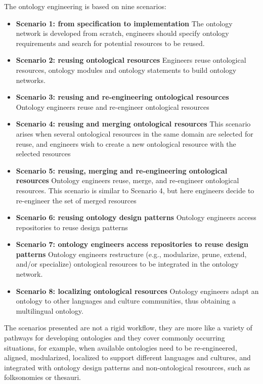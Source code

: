 The ontology engineering is based on nine scenarios:
\begin{itemize}
    \item \textbf{Scenario 1: from specification to implementation} The ontology network is developed from scratch, engineers should specify ontology requirements and search for potential resources to be reused. 

    \item \textbf{Scenario 2: reusing ontological resources} Engineers reuse ontological resources, ontology modules and ontology statements to build ontology networks. 

    \item \textbf{Scenario 3: reusing and re-engineering ontological resources} Ontology engineers reuse and re-engineer ontological resources

    \item \textbf{Scenario 4: reusing and merging ontological resources} This scenario arises when several ontological resources in the same domain are selected for reuse, and engineers wish to create a new ontological resource with the selected resources

    \item \textbf{Scenario 5: reusing, merging and re-engineering ontological resources} Ontology engineers reuse, merge, and re-engineer ontological resources. 
    This scenario is similar to Scenario 4, but here engineers decide to re-engineer the set of merged resources

    \item  \textbf{Scenario 6: reusing ontology design patterns} Ontology engineers access repositories to reuse design patterns

    \item \textbf{Scenario 7: ontology engineers access repositories to reuse design patterns} Ontology engineers restructure (e.g., modularize, prune, extend, and/or specialize) ontological resources to be  integrated in the ontology network. 

    \item \textbf{Scenario 8: localizing ontological resources} Ontology engineers adapt an ontology to other languages and culture communities, thus obtaining a multilingual ontology.

\end{itemize}
The scenarios presented are not a rigid workflow, they are more like a variety of pathways for developing ontologies and they cover commonly occurring situations, for example, when available ontologies need to be re-engineered, aligned, modularized, localized to support different languages and cultures, and integrated with ontology design patterns and non-ontological resources, such as folksonomies or thesauri\cite{suarez2011neon}.

